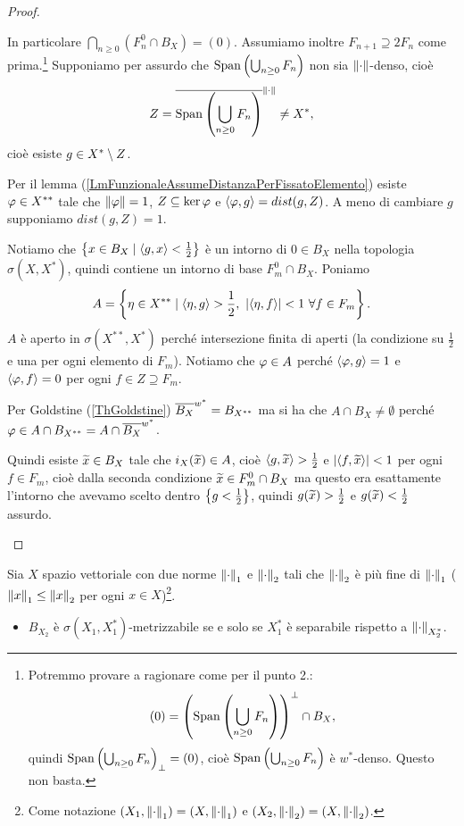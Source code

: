 \begin{proof}
\begin{enumerate}
\begin{itemize}
	In particolare $\bigcap_{n\geq 0}(F_n^0\cap B_X)=(0)$. Assumiamo inoltre $F_{n+1}\supseteq 2F_n$ come prima.\footnote{
	Potremmo provare a ragionare come per il punto 2.:
	\[(0)=\left({\operatorname{Span}\left({\bigcup_{n\geq 0}F_n}\right)}\right)^\perp\cap B_X,\]
	quindi $\operatorname{Span}\left({\bigcup_{n\geq 0}F_n}\right)_\perp=(0)$, cio\`e $\operatorname{Span}\left({\bigcup_{n\geq 0}F_n}\right)$ \`e $w^\ast$-denso. Questo non basta.}
	Supponiamo per assurdo che $\operatorname{Span}\left({\bigcup_{n\geq 0}F_n}\right)$ non sia ${\left\Vert{\cdot}\right\Vert}$-denso, cio\`e 
	\[Z=\overline{\operatorname{Span}\left({\bigcup_{n\geq 0}F_n}\right)}^{{\left\Vert{\cdot}\right\Vert}}\neq X^\ast,\] cio\`e esiste $g\in X^\ast\setminus Z$.

	Per il lemma (\ref{LmFunzionaleAssumeDistanzaPerFissatoElemento}) esiste $\varphi\in X^{\ast\ast}$ tale che $\left\Vert{\varphi}\right\Vert=1$, $Z\subseteq \ker \varphi$ e $\left\langle {\varphi,g}\right\rangle=dist(g,Z)$. A meno di cambiare $g$ supponiamo $dist(g,Z)=1$. 
	
	Notiamo che $\left\{{x\in B_X\mid \left\langle {g,x}\right\rangle<\frac12}\right\}$ \`e un intorno di $0\in B_X$ nella topologia $\sigma(X,X^\ast)$, quindi contiene un intorno di base $F_m^0\cap B_X$. Poniamo
	\[A=\left\{{\eta\in X^{\ast\ast}\mid \left\langle {\eta,g}\right\rangle>\frac12,\ \left|{\left\langle {\eta,f}\right\rangle}\right|<1\ \forall f\in F_m}\right\}.\]
	$A$ \`e aperto in $\sigma(X^{\ast\ast},X^\ast)$ perch\'e intersezione finita di aperti (la condizione su $\frac12$ e una per ogni elemento di $F_m$). Notiamo che $\varphi\in A$ perch\'e $\left\langle {\varphi,g}\right\rangle=1$ e $\left\langle {\varphi,f}\right\rangle=0$ per ogni $f\in Z\supseteq F_m$.

	Per Goldstine (\ref{ThGoldstine}) $\overline{B_X}^{w^\ast}=B_{X^{\ast\ast}}$ ma si ha che $A\cap B_X\neq \emptyset$ perch\'e $\varphi\in A\cap B_{X^{\ast\ast}}=A\cap \overline{B_X}^{w^\ast}$.

	Quindi esiste $\widetilde{x}\in B_X$ tale che $i_X(\widetilde{x})\in A$, cio\`e $\left\langle {g,\widetilde{x}}\right\rangle>\frac12$ e $\left|{\left\langle {f,\widetilde{x}}\right\rangle}\right|<1$ per ogni $f\in F_m$, cio\`e dalla seconda condizione $\widetilde{x}\in F_m^0\cap B_X$ ma questo era esattamente l'intorno che avevamo scelto dentro $\left\{{g<\frac12}\right\}$, quindi $g(\widetilde{x})>\frac12$ e $g(\widetilde{x})<\frac12$ assurdo.
	\end{itemize}
	\setlength{\leftmargini}{0.5cm}
\end{enumerate}
\setlength{\leftmargini}{0.5cm}
\end{proof}

\begin{exercise}
Sia $X$ spazio vettoriale con due norme ${\left\Vert{\cdot}\right\Vert}_1$ e ${\left\Vert{\cdot}\right\Vert}_2$ tali che ${\left\Vert{\cdot}\right\Vert}_2$ \`e pi\`u fine di ${\left\Vert{\cdot}\right\Vert}_1$ ($\left\Vert{x}\right\Vert_1\leq \left\Vert{x}\right\Vert_2$ per ogni $x\in X$)\footnote{Come notazione $(X_1,{\left\Vert{\cdot}\right\Vert}_1)=(X,{\left\Vert{\cdot}\right\Vert}_1)$ e $(X_2,{\left\Vert{\cdot}\right\Vert}_2)=(X,{\left\Vert{\cdot}\right\Vert}_2)$.}.
\begin{itemize}
	\item $B_{X_2}$ \`e $\sigma(X_1,X_1^\ast)$-metrizzabile se e solo se $X_1^\ast$ \`e separabile rispetto a ${\left\Vert{\cdot}\right\Vert}_{X_2^\ast}$.
\end{itemize}
\end{exercise}


